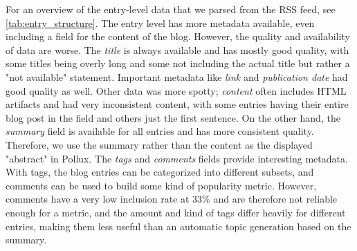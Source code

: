 \documentclass{article}
\begin{document}
For an overview of the entry-level data that we parsed from the RSS feed, see \autoref{tab:entry_structure}. The entry level has more metadata available, even including a field for the content of the blog. However, the quality and availability of data are worse. The \textit{title} is always available and has mostly good quality, with some titles being overly long and some not including the actual title but rather a "not available" statement. Important metadata like \textit{link} and \textit{publication date} had good quality as well. Other data was more spotty; \textit{content} often includes HTML artifacts and had very inconsistent content, with some entries having their entire blog post in the field and others just the first sentence. On the other hand, the \textit{summary} field is available for all entries and has more consistent quality. Therefore, we use the summary rather than the content as the displayed "abstract" in Pollux. The \textit{tags} and \textit{comments} fields provide interesting metadata. With tags, the blog entries can be categorized into different subsets, and comments can be used to build some kind of popularity metric. However, comments have a very low inclusion rate at 33\% and are therefore not reliable enough for a metric, and the amount and kind of tags differ heavily for different entries, making them less useful than an automatic topic generation based on the summary.
\end{document}
